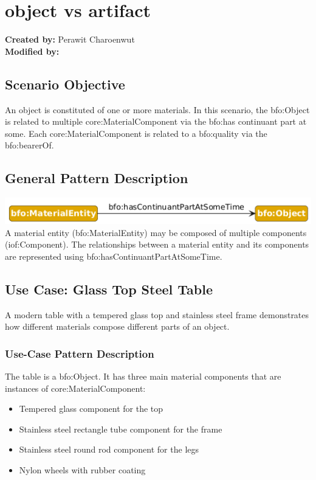 \section{object vs artifact}
\label{chapter-scenario-template}

\textbf{Created by:} Perawit Charoenwut \\
\textbf{Modified by:}

\subsection*{Scenario Objective}

An object is constituted of one or more materials. In this scenario, the bfo:Object is related to multiple core:MaterialComponent via the bfo:has continuant part at some. Each core:MaterialComponent is related to a bfo:quality via the bfo:bearerOf.
\subsection*{General Pattern Description}

\includegraphics[scale=0.5]{scenarios/object-artifact-material/image/what-is-made-of-schema.png}
A material entity (bfo:MaterialEntity) may be composed of multiple components (iof:Component). The relationships between a material entity and its components are represented using bfo:hasContinuantPartAtSomeTime.

\subsection*{Use Case: Glass Top Steel Table}
A modern table with a tempered glass top and stainless steel frame demonstrates how different materials compose different parts of an object.

\subsubsection*{Use-Case Pattern Description}
The table is a bfo:Object. It has three main material components that are instances of core:MaterialComponent: 
\begin{itemize}
    \item Tempered glass component for the top
    \item Stainless steel rectangle tube component for the frame
    \item Stainless steel round rod component for the legs
    \item Nylon wheels with rubber coating
\end{itemize}

